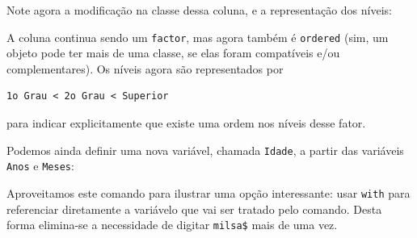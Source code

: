 \documentclass[
  10pt,
  a4paper]{book}
\newenvironment{Shaded}{\begin{snugshade}}{\end{snugshade}}
\newcommand{\DecValTok}[1]{\textcolor[rgb]{0.00,0.00,0.81}{#1}}
\newcommand{\FunctionTok}[1]{\textcolor[rgb]{0.00,0.00,0.00}{#1}}
\newcommand{\NormalTok}[1]{#1}
\newcommand{\OtherTok}[1]{\textcolor[rgb]{0.56,0.35,0.01}{#1}}
\newcommand{\SpecialCharTok}[1]{\textcolor[rgb]{0.00,0.00,0.00}{#1}}
\newcommand{\StringTok}[1]{\textcolor[rgb]{0.31,0.60,0.02}{#1}}
\begin{document}
Note agora a modificação na classe dessa coluna, e a representação dos níveis:

\begin{Shaded}
\end{Shaded}

A coluna continua sendo um \texttt{factor}, mas agora também é \texttt{ordered} (sim,
um objeto pode ter mais de uma classe, se elas foram compatíveis e/ou
complementares). Os níveis agora são representados por

\begin{verbatim}
1o Grau < 2o Grau < Superior
\end{verbatim}

para indicar explicitamente que existe uma ordem nos níveis desse fator.

Podemos ainda definir uma nova variável, chamada \texttt{Idade}, a partir das
variáveis \texttt{Anos} e \texttt{Meses}:

\begin{Shaded}
\end{Shaded}

Aproveitamos este comando para ilustrar uma opção interessante: usar \texttt{with} para referenciar diretamente a variávelo que vai ser tratado pelo comando. Desta forma elimina-se a necessidade de digitar \texttt{milsa\$} mais de uma vez.
\end{document}
